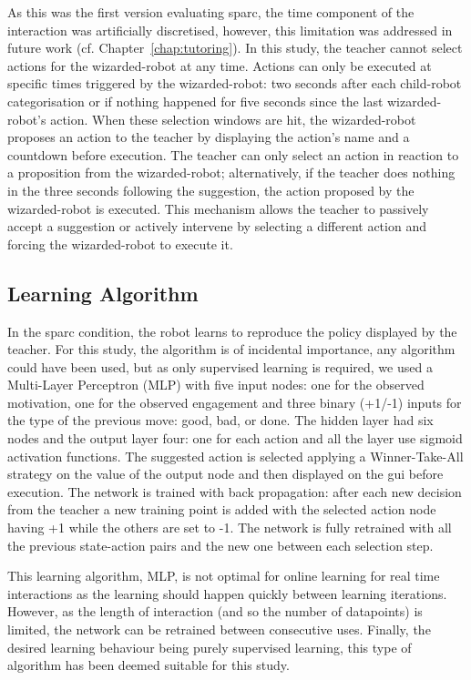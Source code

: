 As this was the first version evaluating \gls{sparc}, the time component of the interaction was artificially discretised, however, this limitation was addressed in future work (cf. Chapter~\ref{chap:tutoring}). In this study, the teacher cannot select actions for the wizarded-robot at any time. Actions can only be executed at specific times triggered by the wizarded-robot: two seconds after each child-robot categorisation or if nothing happened for five seconds since the last wizarded-robot's action. When these selection windows are hit, the wizarded-robot proposes an action to the teacher by displaying the action's name and a countdown before execution. The teacher can only select an action in reaction to a proposition from the wizarded-robot; alternatively, if the teacher does nothing in the three seconds following the suggestion, the action proposed by the wizarded-robot is executed. This mechanism allows the teacher to passively accept a suggestion or actively intervene by selecting a different action and forcing the wizarded-robot to execute it.

\subsection{Learning Algorithm}

In the \gls{sparc} condition, the robot learns to reproduce the policy displayed by the teacher. For this study, the algorithm is of incidental importance, any algorithm could have been used, but as only supervised learning is required, we used a Multi-Layer Perceptron (MLP) with five input nodes: one for the observed motivation, one for the observed engagement and three binary (+1/-1) inputs for the type of the previous move: good, bad, or done. The hidden layer had six nodes and the output layer four: one for each action and all the layer use sigmoid activation functions. The suggested action is selected applying a Winner-Take-All strategy on the value of the output node and then displayed on the \gls{gui} before execution. The network is trained with back propagation: after each new decision from the teacher a new training point is added with the selected action node having +1 while the others are set to -1. The network is fully retrained with all the previous state-action pairs and the new one between each selection step. 

This learning algorithm, MLP, is not optimal for online learning for real time interactions as the learning should happen quickly between learning iterations. However, as the length of interaction (and so the number of datapoints) is limited, the network can be retrained between consecutive uses. Finally, the desired learning behaviour being purely supervised learning, this type of algorithm has been deemed suitable for this study.

